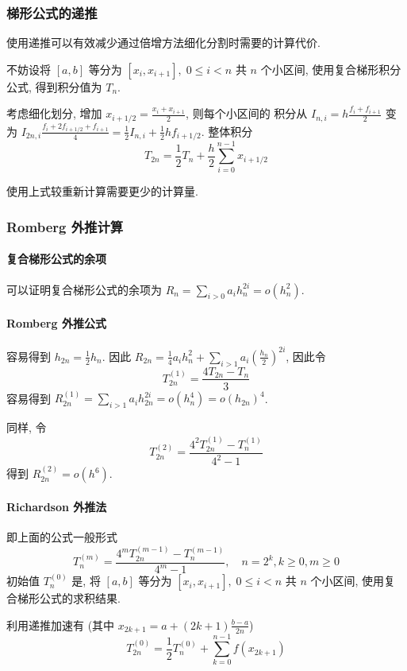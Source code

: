 \documentclass{ctexart}
\begin{document}
\subsubsection{梯形公式的递推}
    使用递推可以有效减少通过倍增方法细化分割时需要的计算代价.\par
    不妨设将 $[a,b]$ 等分为 $[x_i, x_{i+1}],\;0\le i <n$ 共 $n$ 个小区间,
    使用复合梯形积分公式, 得到积分值为 $T_n$.\par
    考虑细化划分, 增加 $x_{i+1/2} = \frac{x_i + x_{i+1}}{2}$, 则每个小区间的
    积分从 $I_{n,i} = h \frac{f_i + f_{i+1}}{2}$ 变为 
    $I_{2n,i}\frac{f_i + 2 f_{i + 1/2} + f_{i+1}}{4} = \frac{1}{2} I_{n,i} + \frac{1}{2} h f_{i+1/2}$.
    整体积分 \[
        T_{2n} = \frac{1}{2} T_n + \frac{h}{2} \sum_{i=0}^{n-1} x_{i+1/2}\]
    \par
    使用上式较重新计算需要更少的计算量.
\subsubsection{Romberg 外推计算}
\paragraph{复合梯形公式的余项}
    可以证明复合梯形公式的余项为 $R_n = \sum_{i > 0} a_i h_n^{2 i} = o(h_n^2)$.
\paragraph{Romberg 外推公式}
    容易得到 $h_{2n} = \frac{1}{2} h_n$. 因此 
    $R_{2n} = \frac{1}{4} a_i h_n^2 + \sum_{i>1} a_i \left(\frac{h_n}{2}\right)^{2 i}$,
    因此令 \[
        T^{(1)}_{2n} = \frac{4 T_{2n} - T_n}{3}\]
    容易得到 $R^{(1)}_{2n} = \sum_{i > 1} a_i h_{2n}^{2 i} = o(h_n^4) = o(h_{2n})^4$.\par
    同样, 令 \[
        T^{(2)}_{2n} = \frac{4^2 T^{(1)}_{2n} - T^{(1)}_n}{4^2 - 1}\]
    得到 $R^{(2)}_{2n} = o(h^6)$.
\paragraph{Richardson 外推法}
    即上面的公式一般形式 \[
        T^{(m)}_n = \frac{4^m T^{(m-1)}_{2n} - T^{(m-1)}_n}{4^m -1},\quad n = 2^k, k \ge 0, m \ge 0\]
    初始值 $ T^{(0)}_n $ 是, 将 $[a,b]$ 等分为 $[x_i, x_{i+1}],\;0\le i <n$ 共 $n$ 个小区间,
    使用复合梯形公式的求积结果.\par
    利用递推加速有 (其中 $x_{2k + 1} = a + (2 k + 1) \frac{b - a}{2n}$) \[
        T^{(0)}_{2n} = \frac{1}{2} T^{(0)}_n + \sum_{k=0}^{n-1} f(x_{2 k + 1})\]
\end{document}
